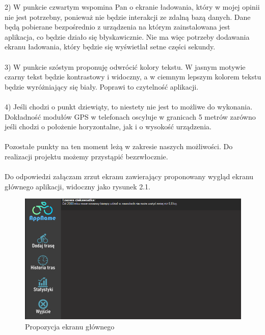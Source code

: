 2) W punkcie czwartym wspomina Pan o ekranie ładowania, który w mojej opinii nie jest potrzebny, ponieważ nie będzie interakcji ze zdalną bazą danych. Dane będą pobierane bezpośrednio z urządzenia na którym zainstalowana jest aplikacja, co będzie działo się błyskawicznie. Nie ma więc potrzeby dodawania ekranu ładowania, który będzie się wyświetlał setne części sekundy. \\\\
3) W punkcie szóstym proponuję odwrócić kolory tekstu. W jasnym motywie czarny tekst będzie kontrastowy i widoczny, a w ciemnym lepszym kolorem tekstu będzie wyróżniający się biały. Poprawi to czytelność aplikacji. \\\\
4) Jeśli chodzi o punkt dziewiąty, to niestety nie jest to możliwe do wykonania. Dokładność modułów GPS w telefonach oscyluje w granicach 5 metrów zarówno jeśli chodzi o położenie horyzontalne, jak i o wysokość urządzenia. \\\\
Pozostałe punkty na ten moment leżą w zakresie naszych możliwości. Do realizacji projektu możemy przystąpić bezzwłocznie. \\\\
Do odpowiedzi załączam zrzut ekranu zawierający proponowany wygląd ekranu głównego aplikacji, widoczny jako rysunek 2.1.\\


	\begin{figure}[!htb]
	\begin{center}
		\includegraphics[width=15cm]{rys/main_screen.png}
		\caption{Propozycja ekranu głównego}
		\label{rys:Propozycja ekranu głównego}
	\end{center}
\end{figure}


